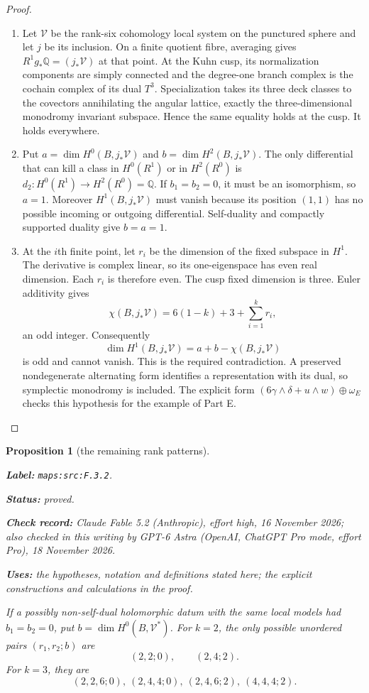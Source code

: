 \documentclass[11pt,a4paper]{article}
\newtheorem{proposition}[proposition]{Proposition}
\theoremstyle{definition}
\newcommand{\StatementRecord}[4]{\par\smallskip\begingroup\upshape\raggedright\noindent\textbf{Label:} \nolinkurl{#1}.\par\noindent\textbf{Status:} #2.\par\noindent\textbf{Check record:} #3.\par\noindent\textbf{Uses:} #4.\par\endgroup\smallskip}
\newcommand{\CurrentChecker}{GPT-6 Astra (OpenAI, ChatGPT Pro mode, effort Pro), 18 November 2026}
\begin{document}
\begin{proof}
\begin{enumerate}[label=\arabic*.]
\item Let $\mathcal V$ be the rank-six cohomology local system on
the punctured sphere and let $j$ be its inclusion.  On a finite
quotient fibre, averaging gives $R^1g_*\mathbb Q=(j_*\mathcal V)$
at that point.  At the Kuhn cusp, its normalization components
are simply connected and the degree-one branch complex is
the cochain complex of its dual $T^3$.  Specialization takes
its three deck classes to the covectors annihilating the
angular lattice, exactly the three-dimensional monodromy
invariant subspace.  Hence the same equality holds at the cusp.
It holds everywhere.

\item Put $a=\dim H^0(B,j_*\mathcal V)$ and
$b=\dim H^2(B,j_*\mathcal V)$.  The only differential that
can kill a class in $H^0(R^1)$ or in $H^2(R^0)$ is
$d_2:H^0(R^1)\to H^2(R^0)=\mathbb Q$.  If $b_1=b_2=0$,
it must be an isomorphism, so $a=1$.  Moreover
$H^1(B,j_*\mathcal V)$ must vanish because its position
$(1,1)$ has no possible incoming or outgoing differential.
Self-duality and compactly supported duality give $b=a=1$.

\item At the $i$th finite point, let $r_i$ be the dimension of the
fixed subspace in $H^1$.  The derivative is complex linear,
so its one-eigenspace has even real dimension.  Each $r_i$
is therefore even.  The cusp fixed dimension is three.
Euler additivity gives
\[
 \chi(B,j_*\mathcal V)=6(1-k)+3+\sum_{i=1}^k r_i,
\]
an odd integer.  Consequently
\[
 \dim H^1(B,j_*\mathcal V)=a+b-\chi(B,j_*\mathcal V)
\]
is odd and cannot vanish.  This is the required contradiction.
A preserved nondegenerate alternating form identifies a
representation with its dual, so symplectic monodromy is
included.  The explicit form
$(6\gamma\wedge\delta+u\wedge w)\oplus\omega_E$
checks this hypothesis for the example of Part E.

\end{enumerate}
\end{proof}




\begin{proposition}[the remaining rank patterns]\label{maps:src:F.3.2}
\StatementRecord{maps:src:F.3.2}{proved}{Claude Fable 5.2 (Anthropic), effort high, 16 November 2026; also checked in this writing by \CurrentChecker}{the hypotheses, notation and definitions stated here; the explicit constructions and calculations in the proof}


If a possibly non-self-dual holomorphic datum with the same
local models had $b_1=b_2=0$, put
$b=\dim H^0(B,\mathcal V^*)$.  For $k=2$, the only possible
unordered pairs $(r_1,r_2;b)$ are
\[
 (2,2;0),\qquad(2,4;2).
\]
For $k=3$, they are
\[
 (2,2,6;0),\ (2,4,4;0),\ (2,4,6;2),\ (4,4,4;2).
 \tag{F.4}\label{maps:eq:F.4}
\]

\end{proposition}
\end{document}

